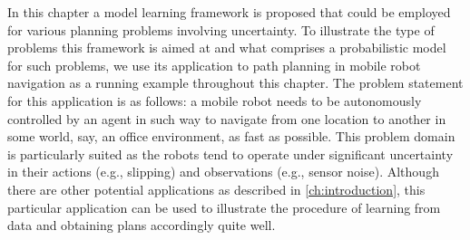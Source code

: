 
In this chapter a model learning framework is proposed that could be employed for various planning problems involving uncertainty.
To illustrate the type of problems this framework is aimed at and what comprises a probabilistic model for such problems, we use its application to path planning in mobile robot navigation as a running example throughout this chapter.
The problem statement for this application is as follows: a mobile robot needs to be autonomously controlled by an agent in such way to navigate from one location to another in some world, say, an office environment, as fast as possible.
This problem domain is particularly suited as the robots tend to operate under significant uncertainty in their actions (e.g., slipping) and observations (e.g., sensor noise).
Although there are other potential applications as described in \autoref{ch:introduction}, this particular application can be used to illustrate the procedure of learning  from data and obtaining plans accordingly quite well.

